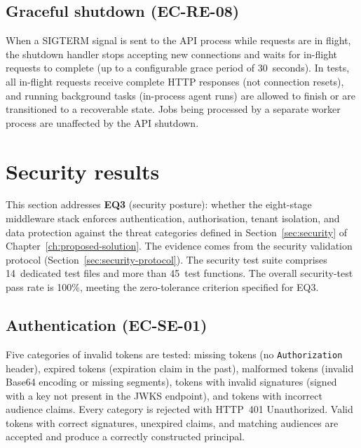 \documentclass[a4paper]{sapthesis}
\begin{document}
\subsection{Graceful shutdown (EC-RE-08)}

When a SIGTERM signal is sent to the API process while requests are in
flight, the shutdown handler stops accepting new connections and waits
for in-flight requests to complete (up to a configurable grace period of
30~seconds).  In tests, all in-flight requests receive complete HTTP
responses (not connection resets), and running background tasks
(in-process agent runs) are allowed to finish or are transitioned to a
recoverable state.  Jobs being processed by a separate worker process
are unaffected by the API shutdown.


\section{Security results}
\label{sec:security-results}

This section addresses \textbf{EQ3} (security posture): whether the
eight-stage middleware stack enforces authentication, authorisation,
tenant isolation, and data protection against the threat categories
defined in Section~\ref{sec:security} of
Chapter~\ref{ch:proposed-solution}.  The evidence comes from the
security validation protocol (Section~\ref{sec:security-protocol}).  The
security test suite comprises 14~dedicated test files and more than
45~test functions.  The overall security-test pass rate is 100\%, meeting
the zero-tolerance criterion specified for EQ3.

\subsection{Authentication (EC-SE-01)}

Five categories of invalid tokens are tested: missing tokens (no
\texttt{Authorization} header), expired tokens (expiration claim in the
past), malformed tokens (invalid Base64 encoding or missing segments),
tokens with invalid signatures (signed with a key not present in the
JWKS endpoint), and tokens with incorrect audience claims.  Every
category is rejected with HTTP~401 Unauthorized.  Valid tokens with
correct signatures, unexpired claims, and matching audiences are
accepted and produce a correctly constructed principal.
\end{document}
